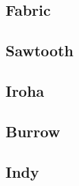 \subsection{Fabric}


\subsection{Sawtooth}


\subsection{Iroha}


\subsection{Burrow}


\subsection{Indy}
